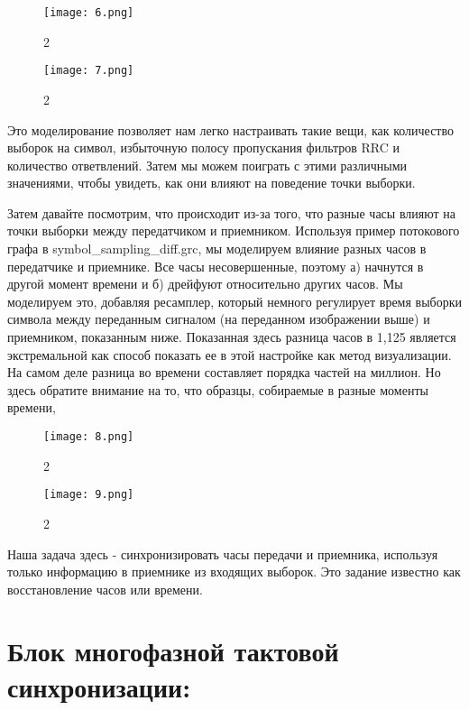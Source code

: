 \documentclass[10pt,a4paper,oneside]{article}
\begin{document}
\begin{figure}[H]
        \centering
        \texttt{[image: 6.png]}
        \caption{2}
        \label{fig:first}
\end{figure}

\begin{figure}[H]
        \centering
        \texttt{[image: 7.png]}
        \caption{2}
        \label{fig:first}
\end{figure}

Это моделирование позволяет нам легко настраивать такие вещи, как количество выборок на символ, избыточную полосу пропускания фильтров RRC и количество ответвлений. Затем мы можем поиграть с этими различными значениями, чтобы увидеть, как они влияют на поведение точки выборки.

Затем давайте посмотрим, что происходит из-за того, что разные часы влияют на точки выборки между передатчиком и приемником. Используя пример потокового графа в symbol_sampling_diff.grc, мы моделируем влияние разных часов в передатчике и приемнике. Все часы несовершенные, поэтому а) начнутся в другой момент времени и б) дрейфуют относительно других часов. Мы моделируем это, добавляя ресамплер, который немного регулирует время выборки символа между переданным сигналом (на переданном изображении выше) и приемником, показанным ниже. Показанная здесь разница часов в 1,125 является экстремальной как способ показать ее в этой настройке как метод визуализации. На самом деле разница во времени составляет порядка частей на миллион. Но здесь обратите внимание на то, что образцы, собираемые в разные моменты времени,

\begin{figure}[H]
        \centering
        \texttt{[image: 8.png]}
        \caption{2}
        \label{fig:first}
\end{figure}

\begin{figure}[H]
        \centering
        \texttt{[image: 9.png]}
        \caption{2}
        \label{fig:first}
\end{figure}

Наша задача здесь - синхронизировать часы передачи и приемника, используя только информацию в приемнике из входящих выборок. Это задание известно как восстановление часов или времени.

\section{Блок многофазной тактовой синхронизации:}
\end{document}
